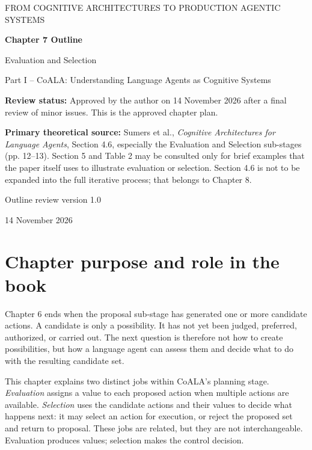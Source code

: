 


\thispagestyle{empty}
\begin{center}
{\sffamily\Large\color{BookBlue} FROM COGNITIVE ARCHITECTURES TO PRODUCTION AGENTIC SYSTEMS\par}
\vspace{1.2cm}
{\sffamily\huge\bfseries\color{BookBlue} Chapter 7 Outline\par}
\vspace{0.45cm}
{\sffamily\LARGE Evaluation and Selection\par}
\vspace{0.8cm}
{\large Part I -- CoALA: Understanding Language Agents as Cognitive Systems\par}
\vfill
\begin{learningbox}
\textbf{Review status:} Approved by the author on 14 November 2026 after a final review of minor issues. This is the approved chapter plan.

\textbf{Primary theoretical source:} Sumers et al., \emph{Cognitive Architectures for Language Agents}, Section 4.6, especially the Evaluation and Selection sub-stages (pp. 12--13). Section 5 and Table 2 may be consulted only for brief examples that the paper itself uses to illustrate evaluation or selection. Section 4.6 is not to be expanded into the full iterative process; that belongs to Chapter 8.
\end{learningbox}
\vfill
{\sffamily\large Outline review version 1.0\par}
{\small 14 November 2026\par}
\end{center}
\clearpage

\setcounter{chapter}{7}
\section{Chapter purpose and role in the book}
Chapter 6 ends when the proposal sub-stage has generated one or more candidate actions. A candidate is only a possibility. It has not yet been judged, preferred, authorized, or carried out. The next question is therefore not how to create possibilities, but how a language agent can assess them and decide what to do with the resulting candidate set.

This chapter explains two distinct jobs within CoALA's planning stage. \emph{Evaluation} assigns a value to each proposed action when multiple actions are available. \emph{Selection} uses the candidate actions and their values to decide what happens next: it may select an action for execution, or reject the proposed set and return to proposal. These jobs are related, but they are not interchangeable. Evaluation produces values; selection makes the control decision.


